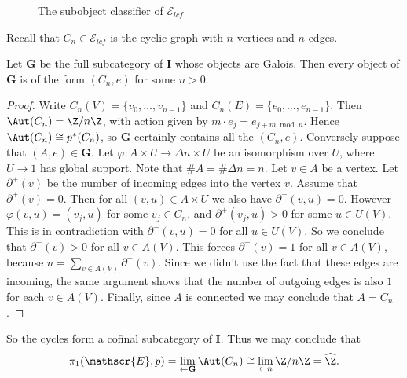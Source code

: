 \begin{figure}
\centering
{}
\caption{The subobject classifier of $\mathscr{E}_{lcf}$}
\end{figure}

Recall that $C_n \in \mathscr{E}_{lcf}$ is the cyclic graph with $n$ vertices and $n$ edges.

\begin{claim}
Let $\mathbf{G}$ be the full subcategory of $\mathbf{I}$ whose objects are Galois. Then every object of $\mathbf{G}$ is of the form $(C_n,e)$ for some $n > 0$.
\end{claim}
\begin{proof}
Write $C_n(V) = \{v_0,\ldots,v_{n-1}\}$ and $C_n(E) = \{e_0,\ldots,e_{n-1}\}$. Then $\Aut(C_n) = \Z/n\Z$, with action given by $m \cdot e_j = e_{j + m \bmod{n}}$. Hence $\Aut(C_n) \cong p^*(C_n)$, so $\mathbf{G}$ certainly contains all the $(C_n,e)$. Conversely suppose that $(A,e) \in \mathbf{G}$. Let $\varphi : A \times U \to \Delta n \times U$ be an isomorphism over $U$, where $U \to 1$ has global support. Note that $\# A = \# \Delta n = n$. Let $v \in A$ be a vertex. Let $\partial^+(v)$ be the number of incoming edges into the vertex $v$. Assume that $\partial^+(v) = 0$. Then for all $(v,u) \in A \times U$ we also have $\partial^+(v,u) = 0$. However $\varphi(v,u) = (v_j,u)$ for some $v_j \in C_n$, and $\partial^+(v_j,u) > 0$ for some $u \in U(V)$. This is in contradiction with $\partial^+(v,u) = 0$ for all $u \in U(V)$. So we conclude that $\partial^+(v) > 0$ for all $v \in A(V)$. This forces $\partial^+(v) = 1$ for all $v \in A(V)$, because $n = \sum_{v \in A(V)} \partial^+(v)$. Since we didn't use the fact that these edges are incoming, the same argument shows that the number of outgoing edges is also $1$ for each $v \in A(V)$. Finally, since $A$ is connected we may conclude that $A = C_n$.
\end{proof}

So the cycles form a cofinal subcategory of $\mathbf{I}$. Thus we may conclude that
\[ \pi_1(\mathscr{E}, p) = \lim_{\leftarrow \mathbf{G}} \Aut(C_n) \cong \lim_{\leftarrow n} \Z/n\Z = \widehat{\Z}. \]
